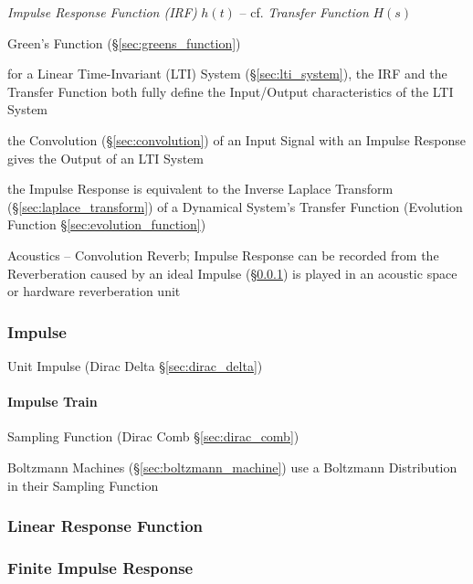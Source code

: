 
\emph{Impulse Response Function (IRF)} $h(t)$ -- cf. \emph{Transfer Function}
$H(s)$

Green's Function (\S\ref{sec:greens_function})

for a Linear Time-Invariant (LTI) System (\S\ref{sec:lti_system}), the IRF and
the Transfer Function both fully define the Input/Output characteristics of the
LTI System

the Convolution (\S\ref{sec:convolution}) of an Input Signal with an Impulse
Response gives the Output of an LTI System

the Impulse Response is equivalent to the Inverse Laplace Transform
(\S\ref{sec:laplace_transform}) of a Dynamical System's Transfer Function
(Evolution Function \S\ref{sec:evolution_function})

Acoustics -- Convolution Reverb; Impulse Response can be recorded from the
Reverberation caused by an ideal Impulse (\S\ref{sec:impulse}) is played in an
acoustic space or hardware reverberation unit



\subsubsection{Impulse}\label{sec:impulse}

Unit Impulse (Dirac Delta \S\ref{sec:dirac_delta})



\paragraph{Impulse Train}\label{sec:impulse_train}\hfill

Sampling Function (Dirac Comb \S\ref{sec:dirac_comb})

Boltzmann Machines (\S\ref{sec:boltzmann_machine}) use a Boltzmann Distribution
in their Sampling Function



\subsubsection{Linear Response Function}\label{sec:linear_response}

\subsubsection{Finite Impulse Response}\label{sec:fir}

